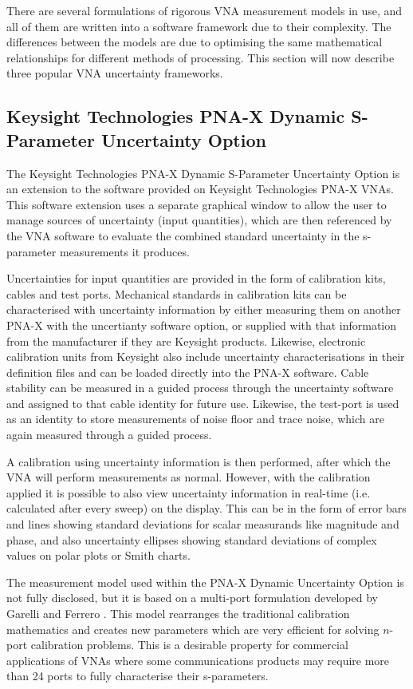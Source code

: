 \documentclass[../thesis/thesis.tex]{subfiles}
\begin{document}
\begin{refsection}
There are several formulations of rigorous VNA measurement models in use, and all of them are written into a software framework due to their complexity. The differences between the models are due to optimising the same mathematical relationships for different methods of processing. This section will now describe three popular VNA uncertainty frameworks.

\subsection{Keysight Technologies PNA-X Dynamic S-Parameter Uncertainty Option}

The Keysight Technologies PNA-X Dynamic S-Parameter Uncertainty Option is an extension to the software provided on Keysight Technologies PNA-X VNAs. This software extension uses a separate graphical window to allow the user to manage sources of uncertainty (input quantities), which are then referenced by the VNA software to evaluate the combined standard uncertainty in the s-parameter measurements it produces.

Uncertainties for input quantities are provided in the form of calibration kits, cables and test ports. Mechanical standards in calibration kits can be characterised with uncertainty information by either measuring them on another PNA-X with the uncertianty software option, or supplied with that information from the manufacturer if they are Keysight products. Likewise, electronic calibration units from Keysight also include uncertainty characterisations in their definition files and can be loaded directly into the PNA-X software. Cable stability can be measured in a guided process through the uncertainty software and assigned to that cable identity for future use. Likewise, the test-port is used as an identity to store measurements of noise floor and trace noise, which are again measured through a guided process.

A calibration using uncertainty information is then performed, after which the VNA will perform measurements as normal. However, with the calibration applied it is possible to also view uncertainty information in real-time (i.e. calculated after every sweep) on the display. This can be in the form of error bars and lines showing standard deviations for scalar measurands like magnitude and phase, and also uncertainty ellipses showing standard deviations of complex values on polar plots or Smith charts.

The measurement model used within the PNA-X Dynamic Uncertainty Option is not fully disclosed, but it is based on a multi-port formulation developed by Garelli and Ferrero \cite{Garelli_2012}. This model rearranges the traditional calibration mathematics and creates new parameters which are very efficient for solving $n$-port calibration problems. This is a desirable property for commercial applications of VNAs where some communications products may require more than 24 ports to fully characterise their s-parameters.


\end{refsection}
\end{document}

